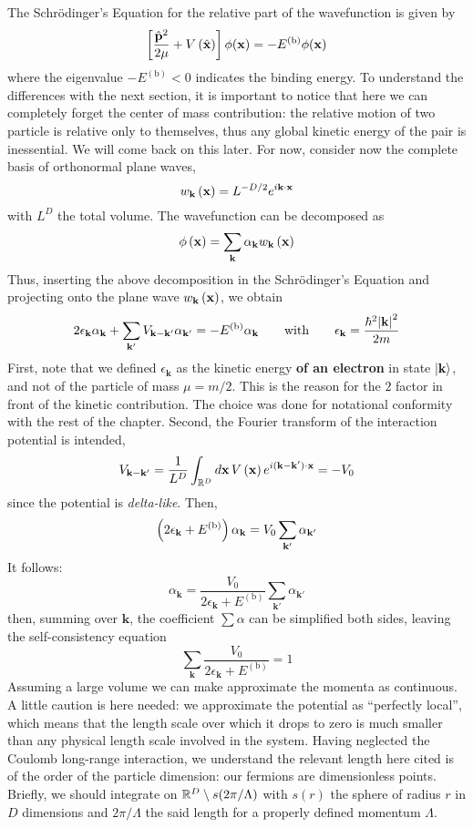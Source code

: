 The Schrödinger's Equation for the relative part of the wavefunction is given by
\[
	\left[{\frac{\hat{\mathbf{p}}^2}{2\mu} + V \left({\hat{\mathbf{x}}}\right)}\right] \phi(\mathbf{x}) = - E^{(\mathrm{b})} \phi(\mathbf{x})
\]
where the eigenvalue $- E^{(\mathrm{b})} < 0$ indicates the binding energy. To understand the differences with the next section, it is important to notice that here we can completely forget the center of mass contribution: the relative motion of two particle is relative only to themselves, thus any global kinetic energy of the pair is inessential. We will come back on this later. For now, consider now the complete basis of orthonormal plane waves,
\[
	w_\mathbf{k} \left({\mathbf{x}}\right) = L^{-D/2} e^{i \mathbf{k} \cdot \mathbf{x}}
\]
with $L^D$ the total volume. The wavefunction can be decomposed as
\[
	\phi\left({\mathbf{x}}\right) = \sum_\mathbf{k} \alpha_\mathbf{k} w_\mathbf{k} \left({\mathbf{x}}\right)
\]
Thus, inserting the above decomposition in the Schrödinger's Equation and projecting onto the plane wave $w_\mathbf{k} \left({\mathbf{x}}\right)$, we obtain
\[
	2\epsilon_\mathbf{k} \alpha_\mathbf{k} + \sum_{\mathbf{k}'} V_{\mathbf{k}-\mathbf{k}'} \alpha_{\mathbf{k}'} = - E^{(\mathrm{b})} \alpha_\mathbf{k}
	\quad\qq{with}\quad
	\epsilon_\mathbf{k} = \frac{\hbar^2 \abs{\mathbf{k}}^2}{2m}
\]
First, note that we defined $\epsilon_\mathbf{k}$ as the kinetic energy \textbf{of an electron} in state $\ket{\mathbf{k}}$, and not of the particle of mass $\mu=m/2$. This is the reason for the $2$ factor in front of the kinetic contribution. The choice was done for notational conformity with the rest of the chapter. Second, the Fourier transform of the interaction potential is intended,
\[
	V_{\mathbf{k}-\mathbf{k}'} = \frac{1}{L^D} \int_{\mathbb{R}^D} d\mathbf{x} \, V \left({\mathbf{x}}\right) e^{i(\mathbf{k}-\mathbf{k}') \cdot \mathbf{x}} = - V_0
\]
since the potential is \textit{delta-like}.  Then,
\[
	\left({2\epsilon_\mathbf{k} + E^{(\mathrm{b})}}\right) \alpha_\mathbf{k} = V_0 \sum_{\mathbf{k}'} \alpha_{\mathbf{k}'}
\]
It follows:
\[
	\alpha_\mathbf{k} = \frac{V_0}{2\epsilon_\mathbf{k} + E^{(\mathrm{b})}} \sum_{\mathbf{k}'} \alpha_{\mathbf{k}'}
\]
then, summing over $\mathbf{k}$, the coefficient $\sum \alpha$ can be simplified both sides, leaving the self-consistency equation
\[
	\sum_\mathbf{k} \frac{V_0}{2\epsilon_\mathbf{k} + E^{(\mathrm{b})}} = 1
\]
Assuming a large volume we can make approximate the momenta as continuous. A little caution is here needed: we approximate the potential as ``perfectly local'', which means that the length scale over which it drops to zero is much smaller than any physical length scale involved in the system. Having neglected the Coulomb long-range interaction, we understand the relevant length here cited is of the order of the particle dimension: our fermions are dimensionless points. Briefly, we should integrate on $\mathbb{R}^D \setminus s(2\pi/\Lambda)$ with $s(r)$ the sphere of radius $r$ in $D$ dimensions and $2\pi/\Lambda$ the said length for a properly defined momentum $\Lambda$.

